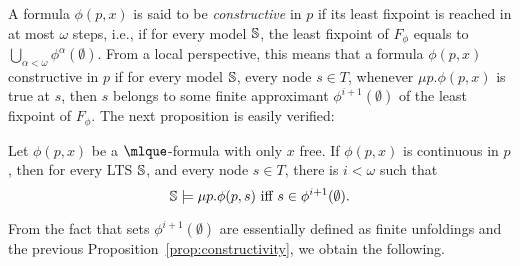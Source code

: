 A formula $\phi(p, x)$ is said to be \emph{constructive} in $p$ if its least fixpoint is reached in at most $\omega$ steps, i.e., if for every model $\mathbb{S}$, the least fixpoint of $F_\phi$ equals to $\bigcup_{\alpha < \omega} \phi^{\alpha}(\emptyset)$. From a local perspective, this means that a formula $\phi(p, x)$ constructive in $p$ if for every model $\mathbb{S}$,  every node $s \in T$, whenever $\mu p. \phi(p,x)$ is true at $s$, then $s$ belongs to some finite approximant $\phi^{i+1}(\emptyset)$ of the least fixpoint of $F_\phi$.
The next proposition is easily verified:%



\begin{proposition}\label{prop:constructivity}
Let $\phi(p,x)$ be a $\mlque$-formula with only $x$ free. If $\phi(p,x)$ is continuous in $p$, then for every LTS $\mathbb{S}$, and every node $s \in T$, there is $i < \omega$ such that
\[\model \models \mu p. \phi(p,s) \text{ iff } s \in \phi^{i+1}(\emptyset).\]
\end{proposition}

From the fact that sets $\phi^{i+1}(\emptyset)$ are essentially defined as finite unfoldings and the previous Proposition~\ref{prop:constructivity}, we obtain the following.

